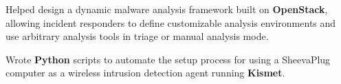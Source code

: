 


\begin{rExperience}

  \item Helped design a dynamic malware analysis framework built on \textbf{OpenStack}, allowing incident responders to define customizable analysis environments and use arbitrary analysis tools in triage or manual analysis mode.

  \item Wrote \textbf{Python} scripts to automate the setup process for using a SheevaPlug computer as a wireless intrusion detection agent running \textbf{Kismet}.

\end{rExperience}
